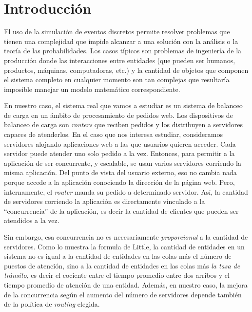 \section*{Introducción}

El uso de la simulación de eventos discretos permite resolver problemas que tienen una complejidad que impide alcanzar
a una solución con la análisis o la teoría de las probabilidades. Los casos típicos son problemas de ingeniería de la
producción donde las interacciones entre entidades (que pueden ser humanos, productos, máquinas, computadoras, etc.) y
la cantidad de objetos que componen el sistema completo en cualquier momento son tan complejas que resultaría imposible
manejar un modelo matemático correspondiente.

En nuestro caso, el sistema real que vamos a estudiar es un sistema de balanceo de carga en un ámbito de procesamiento
de pedidos web. Los dispositivos de balanceo de carga son \textit{routers} que reciben pedidos y los distribuyen a
servidores capaces de atenderlos. En el caso que nos interesa estudiar, consideramos servidores alojando aplicaciones
web a las que usuarios quieren acceder. Cada servidor puede atender uno solo pedido a la vez. Entonces, para permitir a
la aplicación de ser concurrente, y escalable, se usan varios servidores corriendo la misma aplicación. Del punto de
vista del usuario externo, eso no cambia nada porque accede a la aplicación conociendo la dirección de la página web.
Pero, internamente, el \textit{router} manda su pedido a determinado servidor. Así, la cantidad de servidores corriendo
la aplicación es directamente vinculado a la ``concurrencia'' de la aplicación, es decir la cantidad de clientes que
pueden ser atendidos a la vez.

Sin embargo, esa concurrencia no es necesariamente \emph{proporcional} a la cantidad de servidores. Como lo muestra la
formula de Little, la cantidad de entidades en un sistema no es igual a la cantidad de entidades en las colas más el
número de puestos de atención, sino a la cantidad de entidades en las colas más \emph{la tasa de tránsito}, es decir el
cociente entre el tiempo promedio entre dos arribos y el tiempo promedio de atención de una entidad. Además, en nuestro
caso, la mejora de la concurrencia según el aumento del número de servidores depende también de la política de
\textit{routing} elegida.
